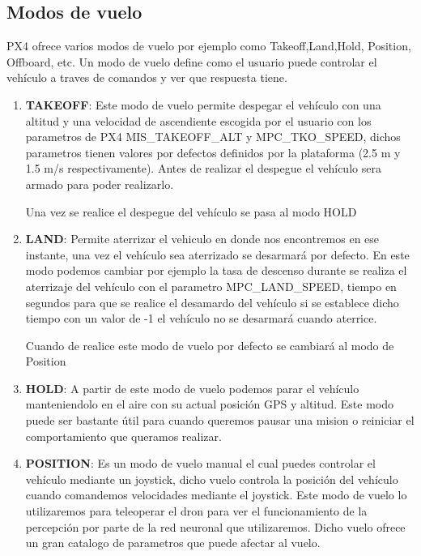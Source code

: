 \subsection{Modos de vuelo}
\label{sec:flight modes} 

PX4 ofrece varios modos de vuelo por ejemplo como Takeoff,Land,Hold, Position, Offboard, etc. Un modo de vuelo define como el usuario puede controlar el vehículo a traves de comandos
  y ver que respuesta tiene. 


  \begin{enumerate}
    \item \textbf{TAKEOFF}: Este modo de vuelo permite despegar el vehículo con una altitud y una velocidad de ascendiente escogida por el usuario con los parametros de PX4 MIS\_TAKEOFF\_ALT y
    MPC\_TKO\_SPEED, dichos parametros tienen valores por defectos definidos por la plataforma (2.5 m y 1.5 m/s respectivamente). Antes de realizar el despegue el vehículo sera armado 
    para poder realizarlo.

    Una vez se realice el despegue del vehículo se pasa al modo HOLD 
    \item \textbf{LAND}: Permite aterrizar el vehiculo en donde nos encontremos en ese instante, una vez el vehículo sea aterrizado se desarmará por defecto. En este modo podemos cambiar por ejemplo
    la tasa de descenso durante se realiza el aterrizaje del vehículo con el parametro MPC\_LAND\_SPEED, tiempo en segundos para que se realice el desamardo del vehículo si se establece dicho tiempo
    con un valor de -1 el vehículo no se desarmará cuando aterrice.
    
    Cuando de realice este modo de vuelo por defecto se cambiará al modo de Position

    \item \textbf{HOLD}: A partir de este modo de vuelo podemos parar el vehículo manteniendolo en el aire con su actual posición GPS y altitud. Este modo puede ser bastante útil para cuando queremos
    pausar una mision o reiniciar el comportamiento que queramos realizar. 

    \item \textbf{POSITION}: Es un modo de vuelo manual el cual puedes controlar el vehículo mediante un joystick, dicho vuelo controla la posición del vehículo cuando comandemos velocidades 
    mediante el joystick. Este modo de vuelo lo utilizaremos para teleoperar el dron para ver el funcionamiento de la percepción por parte de la red neuronal que utilizaremos.
    Dicho vuelo ofrece un gran catalogo de parametros que puede afectar al vuelo.


\end{enumerate}
